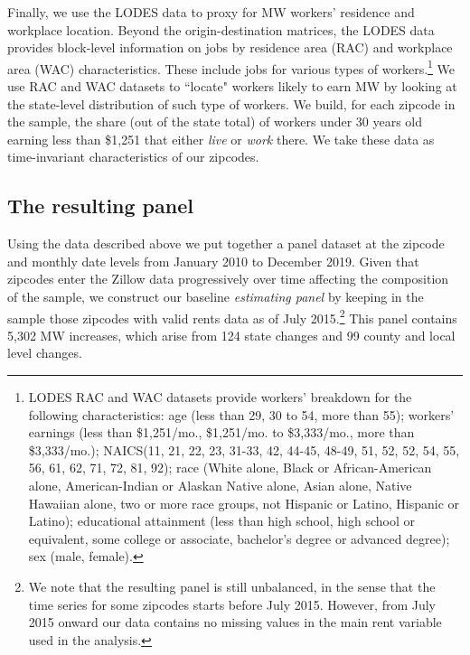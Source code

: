 Finally, we use the LODES data to proxy for MW workers' residence and workplace location. 
Beyond the origin-destination matrices, the LODES data provides block-level information on 
jobs by residence area (RAC) and workplace area (WAC) characteristics. These include jobs 
for various types of workers.\footnote{LODES RAC and WAC datasets provide workers' breakdown 
	for the following characteristics: age (less than 29, 30 to 54, more than 55); workers' 
	earnings (less than \$1,251/mo., \$1,251/mo. to \$3,333/mo., more than \$3,333/mo.); 
	NAICS(11, 21, 22, 23, 31-33, 42, 44-45, 48-49, 51, 52, 52, 54, 55, 56, 61, 62, 71, 72, 
	81, 92); race (White alone, Black or African-American alone, American-Indian or Alaskan 	
	Native alone, Asian alone, Native Hawaiian alone, two or more race groups, not Hispanic 
	or Latino, Hispanic or Latino); educational attainment (less than high school, high 
	school or equivalent, some college or associate, bachelor's degree or advanced degree); 
	sex (male, female).} 
We use RAC and WAC datasets to ``locate" workers likely to earn MW by looking at the 
state-level distribution of such type of workers. We build, for each zipcode in the sample, 
the share (out of the state total) of workers under 30 years old earning less than \$1,251 
that either \textit{live} or \textit{work} there. We take these data as time-invariant 
characteristics of our zipcodes.


\subsection{The resulting panel}

Using the data described above we put together a panel dataset at the zipcode and monthly 
date levels from January 2010 to December 2019. Given that zipcodes enter the Zillow data 
progressively over time affecting the composition of the sample, we construct our baseline 
\textit{estimating panel} by keeping in the sample those zipcodes with valid rents data as 
of July 2015.\footnote{We note that the resulting panel is still unbalanced, in the sense 
	that the time series for some zipcodes starts before July 2015. However, from July
	2015 onward our data contains no missing values in the main rent variable used in the 
	analysis.} 
This panel contains 5,302 MW increases, which arise from 124 state changes 
and 99 county and local level changes.

